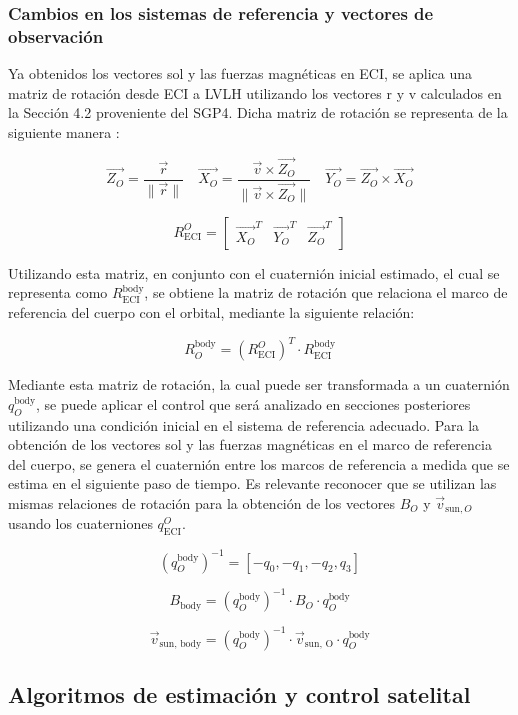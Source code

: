 \subsubsection{Cambios en los sistemas de referencia y vectores de observación}

Ya obtenidos los vectores sol y las fuerzas magnéticas en ECI, se aplica una matriz de rotación desde ECI a LVLH utilizando los vectores \gls{r} y \gls{v} calculados en la Sección 4.2 proveniente del SGP4. Dicha matriz de rotación se representa de la siguiente manera \cite{ref9}:

\[
	\vec{Z_O} = \frac{\vec{r}}{\|\vec{r}\|} \quad 	\vec{X_O} = \frac{\vec{v} \times \vec{Z_O}}{\|\vec{v} \times \vec{Z_O}\|} \quad 	\vec{Y_O} = \vec{Z_O} \times \vec{X_O} 
\]

\[
	R_{\text{ECI}}^O = 
	\begin{bmatrix}
		\vec{X_O}^T &
		\vec{Y_O}^T &
		\vec{Z_O}^T
	\end{bmatrix}
\]

Utilizando esta matriz, en conjunto con el cuaternión inicial estimado, el cual se representa como $R_{\text{ECI}}^{\text{body}}$, se obtiene la matriz de rotación que relaciona el marco de referencia del cuerpo con el orbital, mediante la siguiente relación:

\[
	R_O^{\text{body}} = (R_{\text{ECI}}^{O})^T \cdot R_{\text{ECI}}^{\text{body}}
\]

Mediante esta matriz de rotación, la cual puede ser transformada a un cuaternión $q_O^{\text{body}}$, se puede aplicar el control que será analizado en secciones posteriores utilizando una condición inicial en el sistema de referencia adecuado. Para la obtención de los vectores sol y las fuerzas magnéticas en el marco de referencia del cuerpo, se genera el cuaternión entre los marcos de referencia a medida que se estima en el siguiente paso de tiempo. Es relevante reconocer que se utilizan las mismas relaciones de rotación para la obtención de los vectores $B_O$ y $\vec{v}_{\text{sun}, O}$ usando los cuaterniones $q_{\text{ECI}}^{O}$.

\[
	(q_O^{\text{body}})^{-1} = [-q_0, -q_1, -q_2, q_3]
\]

\[
	B_{\text{body}} = (q_O^{\text{body}})^{-1} \cdot B_O \cdot q_O^{\text{body}}
\]

\[
	\vec{v}_{\text{sun, body}} = (q_O^{\text{body}})^{-1} \cdot \vec{v}_{\text{sun, O}} \cdot q_O^{\text{body}}
\]

\subsection{Algoritmos de estimación y control satelital}

